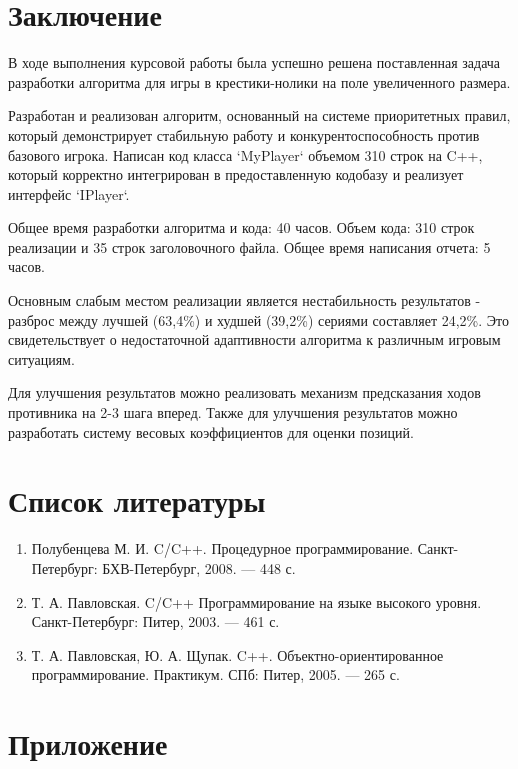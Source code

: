 \documentclass[a4paper]{article}
\begin{document}
\section*{Заключение}

В ходе выполнения курсовой работы была успешно решена поставленная задача разработки алгоритма для игры в крестики-нолики на поле увеличенного размера. 

Разработан и реализован алгоритм, основанный на системе приоритетных правил, который демонстрирует стабильную работу и конкурентоспособность против базового игрока. Написан код класса `MyPlayer` объемом 310 строк на C++, который корректно интегрирован в предоставленную кодобазу и реализует интерфейс `IPlayer`.

Общее время разработки алгоритма и кода: 40 часов. Объем кода: 310 строк реализации и 35 строк заголовочного файла. Общее время написания отчета: 5 часов.

Основным слабым местом реализации является нестабильность результатов - разброс между лучшей (63,4\%) и худшей (39,2\%) сериями составляет 24,2\%. Это свидетельствует о недостаточной адаптивности алгоритма к различным игровым ситуациям.

Для улучшения результатов можно реализовать механизм предсказания ходов противника на 2-3 шага вперед. Также для улучшения результатов можно разработать систему весовых коэффициентов для оценки позиций.
\clearpage

\section*{Список литературы}

\begin{enumerate}
	\item Полубенцева М. И. C/C++. Процедурное программирование. Санкт-Петербург: БХВ-Петербург, 2008. — 448 с.
	\item Т. А. Павловская. C/C++ Программирование на языке высокого уровня. Санкт-Петербург: Питер, 2003. — 461 с.
	\item Т. А. Павловская, Ю. А. Щупак. C++. Объектно-ориентированное программирование. Практикум. СПб: Питер, 2005. — 265 с.
\end{enumerate}

\clearpage

\renewcommand{\thesection}{\Alph{section}}
\setcounter{section}{0}
\section*{Приложение}
\end{document}
